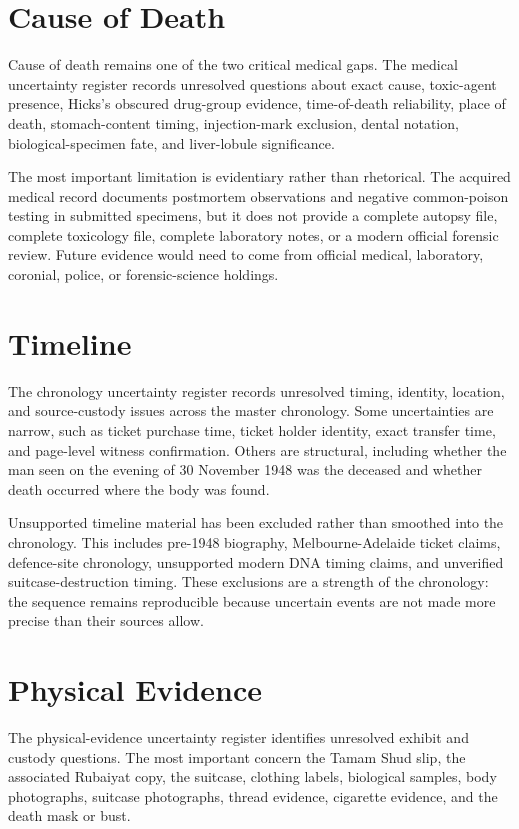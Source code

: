 \section{Cause of Death}

Cause of death remains one of the two critical medical gaps. The medical uncertainty register records unresolved questions about exact cause, toxic-agent presence, Hicks's obscured drug-group evidence, time-of-death reliability, place of death, stomach-content timing, injection-mark exclusion, dental notation, biological-specimen fate, and liver-lobule significance.

The most important limitation is evidentiary rather than rhetorical. The acquired medical record documents postmortem observations and negative common-poison testing in submitted specimens, but it does not provide a complete autopsy file, complete toxicology file, complete laboratory notes, or a modern official forensic review. Future evidence would need to come from official medical, laboratory, coronial, police, or forensic-science holdings.

\section{Timeline}

The chronology uncertainty register records unresolved timing, identity, location, and source-custody issues across the master chronology. Some uncertainties are narrow, such as ticket purchase time, ticket holder identity, exact transfer time, and page-level witness confirmation. Others are structural, including whether the man seen on the evening of 30 November 1948 was the deceased and whether death occurred where the body was found.

Unsupported timeline material has been excluded rather than smoothed into the chronology. This includes pre-1948 biography, Melbourne-Adelaide ticket claims, defence-site chronology, unsupported modern DNA timing claims, and unverified suitcase-destruction timing. These exclusions are a strength of the chronology: the sequence remains reproducible because uncertain events are not made more precise than their sources allow.

\section{Physical Evidence}

The physical-evidence uncertainty register identifies unresolved exhibit and custody questions. The most important concern the Tamam Shud slip, the associated Rubaiyat copy, the suitcase, clothing labels, biological samples, body photographs, suitcase photographs, thread evidence, cigarette evidence, and the death mask or bust.

